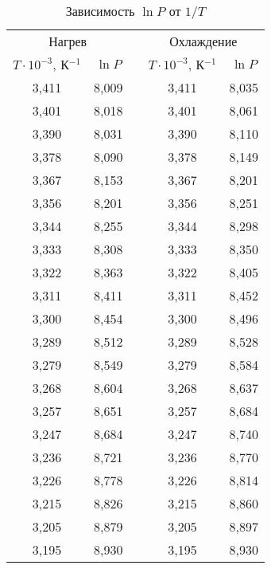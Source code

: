 \documentclass[a4paper,12pt]{article} %
\begin{document}
\begin{table}[H]
	\centering
	\begin{tabular}{|c|c|c|c|c|}
		\cline{1-2} \cline{4-5}
		\multicolumn{2}{|c|}{Нагрев} &  & \multicolumn{2}{c|}{Охлаждение} \\ \cline{1-2} \cline{4-5} 
		$ T \cdot 10^{-3} $, К$ ^{-1} $ & $ \ln P $ &  & $ T \cdot 10^{-3} $, К$ ^{-1} $ & $ \ln P $ \\ \cline{1-2} \cline{4-5} 
		3,411 & 8,009 &  & 3,411 & 8,035 \\ \cline{1-2} \cline{4-5} 
		3,401 & 8,018 &  & 3,401 & 8,061 \\ \cline{1-2} \cline{4-5} 
		3,390 & 8,031 &  & 3,390 & 8,110 \\ \cline{1-2} \cline{4-5} 
		3,378 & 8,090 &  & 3,378 & 8,149 \\ \cline{1-2} \cline{4-5} 
		3,367 & 8,153 &  & 3,367 & 8,201 \\ \cline{1-2} \cline{4-5} 
		3,356 & 8,201 &  & 3,356 & 8,251 \\ \cline{1-2} \cline{4-5} 
		3,344 & 8,255 &  & 3,344 & 8,298 \\ \cline{1-2} \cline{4-5} 
		3,333 & 8,308 &  & 3,333 & 8,350 \\ \cline{1-2} \cline{4-5} 
		3,322 & 8,363 &  & 3,322 & 8,405 \\ \cline{1-2} \cline{4-5} 
		3,311 & 8,411 &  & 3,311 & 8,452 \\ \cline{1-2} \cline{4-5} 
		3,300 & 8,454 &  & 3,300 & 8,496 \\ \cline{1-2} \cline{4-5} 
		3,289 & 8,512 &  & 3,289 & 8,528 \\ \cline{1-2} \cline{4-5} 
		3,279 & 8,549 &  & 3,279 & 8,584 \\ \cline{1-2} \cline{4-5} 
		3,268 & 8,604 &  & 3,268 & 8,637 \\ \cline{1-2} \cline{4-5} 
		3,257 & 8,651 &  & 3,257 & 8,684 \\ \cline{1-2} \cline{4-5} 
		3,247 & 8,684 &  & 3,247 & 8,740 \\ \cline{1-2} \cline{4-5} 
		3,236 & 8,721 &  & 3,236 & 8,770 \\ \cline{1-2} \cline{4-5} 
		3,226 & 8,778 &  & 3,226 & 8,814 \\ \cline{1-2} \cline{4-5} 
		3,215 & 8,826 &  & 3,215 & 8,860 \\ \cline{1-2} \cline{4-5} 
		3,205 & 8,879 &  & 3,205 & 8,897 \\ \cline{1-2} \cline{4-5} 
		3,195 & 8,930 &  & 3,195 & 8,930 \\ \cline{1-2} \cline{4-5} 
	\end{tabular}
	\caption{Зависимость $\ln P$ от $1/T$}
	\label{tab:ln}
\end{table}
\end{document}
